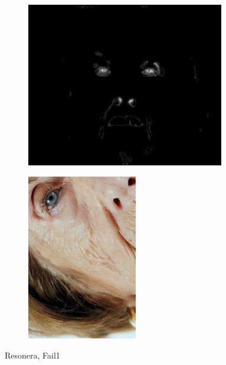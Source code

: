 \begin{figure}[H]
\begin{subfigure}{.25\textwidth}
  \includegraphics[width=0.95\textwidth]{img/fd3/fail1_finalEyeMap.png}
  \caption{}
\end{subfigure}%
\begin{subfigure}{.25\textwidth}
  \centering
  \includegraphics[width=0.53\textwidth]{img/fd3/fail1_output.png}
  \caption{}
\end{subfigure}%

\caption{Resonera, Fail1}
\label{fig:fail1}
\end{figure}


